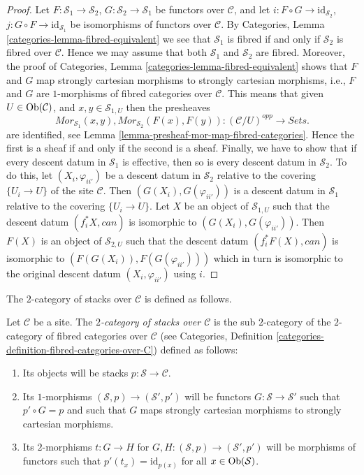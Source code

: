 \begin{proof}
Let $F : \mathcal{S}_1 \to \mathcal{S}_2$,
$G : \mathcal{S}_2 \to \mathcal{S}_1$ be functors over $\mathcal{C}$, and let
$i : F \circ G \to \text{id}_{\mathcal{S}_2}$,
$j : G \circ F \to \text{id}_{\mathcal{S}_1}$ be isomorphisms of
functors over $\mathcal{C}$. By
Categories, Lemma \ref{categories-lemma-fibred-equivalent}
we see that $\mathcal{S}_1$ is fibred if and only if $\mathcal{S}_2$
is fibred over $\mathcal{C}$. Hence we may assume that both
$\mathcal{S}_1$ and $\mathcal{S}_2$ are fibred. Moreover, the proof of
Categories, Lemma \ref{categories-lemma-fibred-equivalent}
shows that $F$ and $G$ map strongly cartesian morphisms to strongly
cartesian morphisms, i.e., $F$ and $G$ are $1$-morphisms of fibred
categories over $\mathcal{C}$. This means that given
$U \in \mathop{\mathrm{Ob}}\nolimits(\mathcal{C})$, and $x, y \in \mathcal{S}_{1, U}$ then
the presheaves
$$
\mathit{Mor}_{\mathcal{S}_1}(x, y),
\mathit{Mor}_{\mathcal{S}_2}(F(x), F(y)) :
(\mathcal{C}/U)^{opp} \longrightarrow \textit{Sets}.
$$
are identified, see
Lemma \ref{lemma-presheaf-mor-map-fibred-categories}. Hence
the first is a sheaf if and only if the second is a sheaf.
Finally, we have to show that if every descent datum in $\mathcal{S}_1$
is effective, then so is every descent datum in $\mathcal{S}_2$.
To do this, let $(X_i, \varphi_{ii'})$ be a descent datum
in $\mathcal{S}_2$ relative to the covering $\{U_i \to U\}$ of the site
$\mathcal{C}$. Then $(G(X_i), G(\varphi_{ii'}))$ is a descent datum
in $\mathcal{S}_1$ relative to the covering $\{U_i \to U\}$.
Let $X$ be an object of $\mathcal{S}_{1, U}$ such that the
descent datum $(f_i^*X, can)$ is isomorphic to
$(G(X_i), G(\varphi_{ii'}))$. Then $F(X)$ is an object of $\mathcal{S}_{2, U}$
such that the descent datum $(f_i^*F(X), can)$ is isomorphic to
$(F(G(X_i)), F(G(\varphi_{ii'})))$ which in turn is isomorphic to
the original descent datum $(X_i, \varphi_{ii'})$ using $i$.
\end{proof}

\noindent
The $2$-category of stacks over $\mathcal{C}$
is defined as follows.

\begin{definition}
\label{definition-stacks-over-C}
Let $\mathcal{C}$ be a site.
The {\it $2$-category of stacks over $\mathcal{C}$}
is the sub $2$-category of the $2$-category of fibred categories
over $\mathcal{C}$ (see
Categories, Definition \ref{categories-definition-fibred-categories-over-C})
defined as follows:
\begin{enumerate}
\item Its objects will be stacks $p : \mathcal{S} \to \mathcal{C}$.
\item Its $1$-morphisms $(\mathcal{S}, p) \to (\mathcal{S}', p')$
will be functors $G : \mathcal{S} \to \mathcal{S}'$ such that
$p' \circ G = p$ and such that $G$ maps strongly cartesian
morphisms to strongly cartesian morphisms.
\item Its $2$-morphisms $t : G \to H$ for
$G, H : (\mathcal{S}, p) \to (\mathcal{S}', p')$
will be morphisms of functors
such that $p'(t_x) = \text{id}_{p(x)}$
for all $x \in \mathop{\mathrm{Ob}}\nolimits(\mathcal{S})$.
\end{enumerate}
\end{definition}

